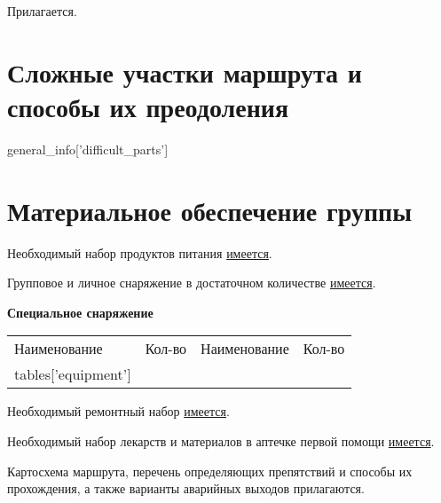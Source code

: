 \documentclass[a5paper, 12pt, twoside]{article}
\begin{document}
        Прилагается.

\newpage %
    
    \section[]{Сложные участки маршрута и способы их преодоления}
        
        {\small%
        \begin{enumerate}
            {{general_info['difficult_parts']}}
        \end{enumerate}}

\newpage %
    \section{Материальное обеспечение группы}\label{s:weight}
        \footnotesize
        Необходимый набор продуктов питания \uline{имеется}.

        Групповое и личное снаряжение в достаточном количестве \uline{имеется}.

        {\centering\textbf{Специальное снаряжение}\par}
        \vspace{-0.3cm}

        \renewcommand{\arraystretch}{1.1}
        {\footnotesize%
        \begin{longtable}{%
            |>{\centering\arraybackslash} m{4.8cm}%
            |>{\centering\arraybackslash} m{1.3cm}%
            |>{\centering\arraybackslash} m{4.8cm}%
            |>{\centering\arraybackslash} m{1.3cm}|}
            \hline\rowcolor{Gray}
            \multicolumn{2}{|c|}{Групповое}                     &   \multicolumn{2}{c|}{Личное}             \\ \hline\rowcolor{Gray}
            Наименование                            &   Кол-во  &   Наименование                &   Кол-во  \\ \hline
            {{tables['equipment']}}
        \end{longtable}}
        \vspace{-0.3cm}

        Необходимый ремонтный набор \uline{имеется}.

        Необходимый набор лекарств и материалов в аптечке первой помощи \uline{имеется}.
    
        Картосхема маршрута, перечень определяющих препятствий и способы их прохождения, а также варианты аварийных выходов прилагаются.
        
\end{document}
